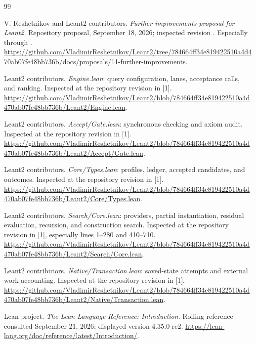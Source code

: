 \clearpage
{}
{}
\begin{thebibliography}{99}
\small
\setlength{\itemsep}{3pt}
\setlength{\parsep}{0pt}
\setlength{\parskip}{0pt}

V. Reshetnikov and Leant2 contributors.
\emph{Further-improvements proposal for Leant2}.
Repository proposal, September 18, 2026; inspected revision
.
Especially  through .
\url{https://github.com/VladimirReshetnikov/Leant2/tree/784664ff34e819422510a4d470ab07fe48bb736b/docs/proposals/11-further-improvements}.

Leant2 contributors.
\emph{Engine.lean}: query configuration, lanes, acceptance calls, and ranking.
Inspected at the repository revision in [1].
\url{https://github.com/VladimirReshetnikov/Leant2/blob/784664ff34e819422510a4d470ab07fe48bb736b/Leant2/Engine.lean}.

Leant2 contributors.
\emph{Accept/Gate.lean}: synchronous checking and axiom audit.
Inspected at the repository revision in [1].
\url{https://github.com/VladimirReshetnikov/Leant2/blob/784664ff34e819422510a4d470ab07fe48bb736b/Leant2/Accept/Gate.lean}.

Leant2 contributors.
\emph{Core/Types.lean}: profiles, ledger, accepted candidates, and outcomes.
Inspected at the repository revision in [1].
\url{https://github.com/VladimirReshetnikov/Leant2/blob/784664ff34e819422510a4d470ab07fe48bb736b/Leant2/Core/Types.lean}.

Leant2 contributors.
\emph{Search/Core.lean}: providers, partial instantiation, residual evaluation, recursion, and construction search.
Inspected at the repository revision in [1], especially lines 1--280 and 410--710.
\url{https://github.com/VladimirReshetnikov/Leant2/blob/784664ff34e819422510a4d470ab07fe48bb736b/Leant2/Search/Core.lean}.

Leant2 contributors.
\emph{Native/Transaction.lean}: saved-state attempts and external work accounting.
Inspected at the repository revision in [1].
\url{https://github.com/VladimirReshetnikov/Leant2/blob/784664ff34e819422510a4d470ab07fe48bb736b/Leant2/Native/Transaction.lean}.

Lean project.
\emph{The Lean Language Reference: Introduction}.
Rolling reference consulted September 21, 2026; displayed version 4.35.0-rc2.
\url{https://lean-lang.org/doc/reference/latest/Introduction/}.


\end{thebibliography}
